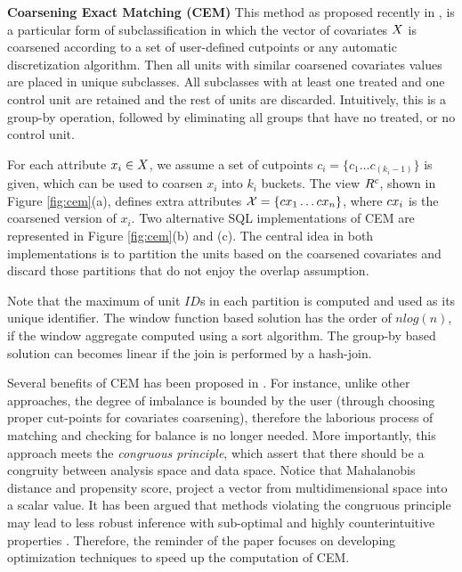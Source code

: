 
{\bf Coarsening Exact Matching (CEM)} This method as proposed
recently in \cite{IacKinPor09},  is a particular form of subclassification in which the vector of covariates ${{X}}$ is
coarsened according to a set of user-defined cutpoints or any
automatic discretization algorithm.  Then all units with similar
coarsened covariates values are placed in unique subclasses. All
subclasses with at least one treated and one control unit are retained
and the rest of units are discarded.  Intuitively, this is a group-by
operation, followed by eliminating all groups that have no treated, or
no control unit. 

For each attribute $x_i \in {{X}}$, we assume a set of cutpoints
$c_i=\{c_{1} \ldots c_{(k_i-1)}\}$ is given, which can be used to
coarsen $x_i$ into $k_i$ buckets. The view ${{R}^c}$, shown in Figure
\ref{fig:cem}(a), defines extra attributes
${{\mathcal{X}}}=\{{{{cx}}}_1 \ldots {{{cx}}}_n\}$, where ${{{cx}}}_i$ is the coarsened
version of $x_i$. Two alternative SQL implementations of CEM are
represented in Figure \ref{fig:cem}(b) and (c).  The central idea in
both implementations is to partition the units based on the coarsened
covariates and discard those partitions that do not enjoy the overlap assumption.  Note that the maximum of unit
$ID$s in each partition is computed and used as its unique
identifier. The window function based solution has the order of
$nlog(n)$, if the window aggregate computed using a sort
algorithm. The group-by based solution can becomes linear if the join
is performed by a hash-join.


Several benefits of CEM has been proposed in \cite{IacKinPor09}. For
instance, unlike other approaches, the degree of imbalance is bounded
by the user (through choosing proper cut-points for covariates
coarsening), therefore the laborious process of matching and checking
for balance is no longer needed.  More importantly, this approach
meets the {\em congruous principle}, which assert that there should be
a congruity between analysis space and data space. Notice that
Mahalanobis distance and propensity score, project a vector from
multidimensional space into a scalar value. It has been argued that
methods violating the congruous principle may lead to less robust
inference with sub-optimal and highly counterintuitive properties
\cite{IacKinPor09}. Therefore, the reminder of the paper focuses on
developing optimization techniques to speed up the computation of
CEM.


\vspace{-2mm} 
